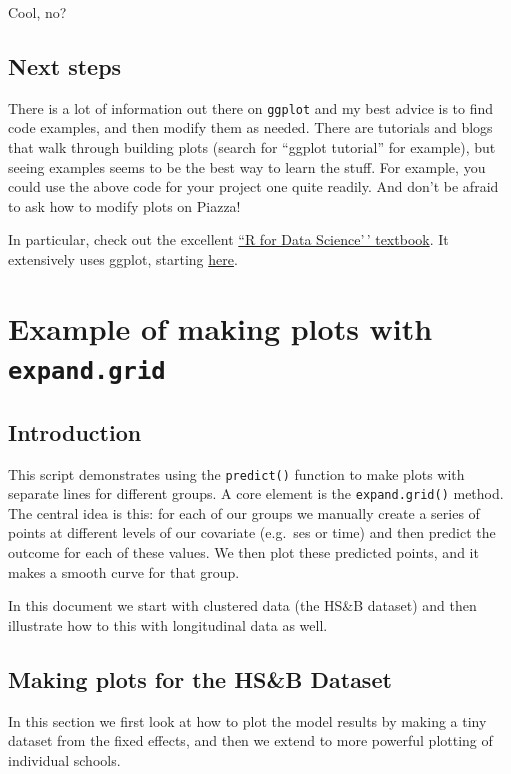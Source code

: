 \documentclass[
  letterpaper,
  DIV=11,
  numbers=noendperiod]{scrreprt}
\begin{document}
Cool, no?

\section{Next steps}\label{next-steps}

There is a lot of information out there on \texttt{ggplot} and my best
advice is to find code examples, and then modify them as needed. There
are tutorials and blogs that walk through building plots (search for
``ggplot tutorial'' for example), but seeing examples seems to be the
best way to learn the stuff. For example, you could use the above code
for your project one quite readily. And don't be afraid to ask how to
modify plots on Piazza!

In particular, check out the excellent \href{http://r4ds.had.co.nz}{``R
for Data Science'\,' textbook}. It extensively uses ggplot, starting
\href{http://r4ds.had.co.nz/data-visualisation.html}{here}.

\chapter{\texorpdfstring{Example of making plots with
\texttt{expand.grid}}{Example of making plots with expand.grid}}\label{example-of-making-plots-with-expand.grid}

\section{Introduction}\label{introduction-2}

This script demonstrates using the \texttt{predict()} function to make
plots with separate lines for different groups. A core element is the
\texttt{expand.grid()} method. The central idea is this: for each of our
groups we manually create a series of points at different levels of our
covariate (e.g.~ses or time) and then predict the outcome for each of
these values. We then plot these predicted points, and it makes a smooth
curve for that group.

In this document we start with clustered data (the HS\&B dataset) and
then illustrate how to this with longitudinal data as well.

\section{Making plots for the HS\&B
Dataset}\label{making-plots-for-the-hsb-dataset}

In this section we first look at how to plot the model results by making
a tiny dataset from the fixed effects, and then we extend to more
powerful plotting of individual schools.
\end{document}

